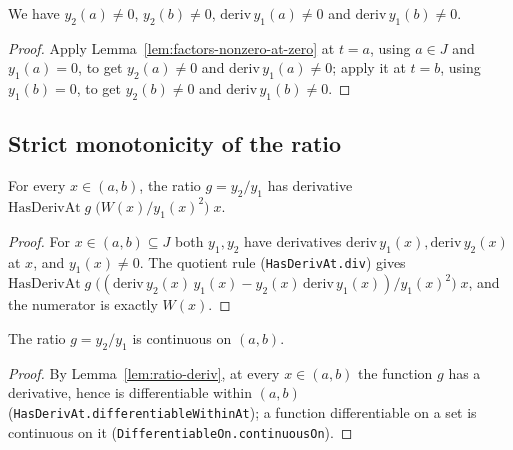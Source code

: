 \begin{lemma}
    \label{lem:endpoints-nonzero}
    \leanok
    We have $y_2(a) \ne 0$, $y_2(b) \ne 0$, $\mathrm{deriv}\,y_1(a) \ne 0$ and
    $\mathrm{deriv}\,y_1(b) \ne 0$.
\end{lemma}
\begin{proof}
    Apply Lemma~\ref{lem:factors-nonzero-at-zero} at $t = a$, using $a \in J$
    and $y_1(a) = 0$, to get $y_2(a) \ne 0$ and $\mathrm{deriv}\,y_1(a) \ne 0$;
    apply it at $t = b$, using $y_1(b) = 0$, to get $y_2(b) \ne 0$ and
    $\mathrm{deriv}\,y_1(b) \ne 0$.
\end{proof}

\subsection{Strict monotonicity of the ratio}

\begin{lemma}
    \label{lem:ratio-deriv}
    \leanok
    For every $x \in (a,b)$, the ratio $g = y_2 / y_1$ has derivative
    $\mathrm{HasDerivAt}\;g\;\bigl(W(x) / y_1(x)^2\bigr)\;x$.
\end{lemma}
\begin{proof}
    For $x \in (a,b) \subseteq J$ both $y_1, y_2$ have derivatives
    $\mathrm{deriv}\,y_1(x), \mathrm{deriv}\,y_2(x)$ at $x$, and $y_1(x) \ne 0$.
    The quotient rule (\texttt{HasDerivAt.div}) gives
    $\mathrm{HasDerivAt}\;g\;\bigl((\mathrm{deriv}\,y_2(x)\,y_1(x) -
    y_2(x)\,\mathrm{deriv}\,y_1(x)) / y_1(x)^2\bigr)\;x$, and the numerator is
    exactly $W(x)$.
\end{proof}

\begin{lemma}
    \label{lem:ratio-continuous}
    \leanok
    The ratio $g = y_2 / y_1$ is continuous on $(a,b)$.
\end{lemma}
\begin{proof}
    By Lemma~\ref{lem:ratio-deriv}, at every $x \in (a,b)$ the function $g$ has
    a derivative, hence is differentiable within $(a,b)$
    (\texttt{HasDerivAt.differentiableWithinAt}); a function differentiable on a
    set is continuous on it (\texttt{DifferentiableOn.continuousOn}).
\end{proof}

